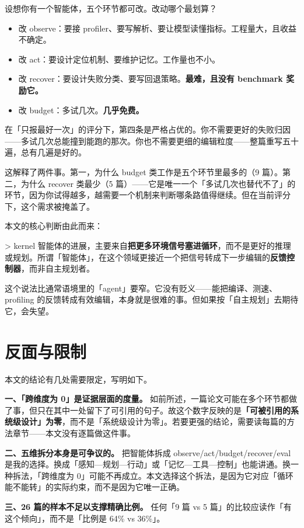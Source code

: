 设想你有一个智能体，五个环节都可改。改动哪个最划算？

\begin{itemize}
\item 改 observe：要接 profiler、要写解析、要让模型读懂指标。工程量大，且收益不确定。
\item 改 act：要设计定位机制、要维护记忆。工作量也不小。
\item 改 recover：要设计失败分类、要写回退策略。\textbf{最难，且没有 benchmark 奖励它。}
\item 改 budget：多试几次。\textbf{几乎免费。}
\end{itemize}

在「只报最好一次」的评分下，第四条是严格占优的。你不需要更好的失败归因——多试几次总能撞到能跑的那次。你也不需要更细的编辑粒度——整篇重写五十遍，总有几遍是好的。

这解释了两件事。第一，为什么 budget 类工作是五个环节里最多的（9 篇）。第二，为什么 recover 类最少（5 篇）——它是唯一一个「多试几次也替代不了」的环节，因为你试得越多，越需要一个机制来判断哪条路值得继续。但在当前评分下，这个需求被掩盖了。

本文的核心判断由此而来：

> kernel 智能体的进展，主要来自\textbf{把更多环境信号塞进循环}，而不是更好的推理或规划。所谓「智能体」，在这个领域更接近一个把信号转成下一步编辑的\textbf{反馈控制器}，而非自主规划者。

这个说法比通常语境里的「agent」要窄。它没有贬义——能把编译、测速、profiling 的反馈转成有效编辑，本身就是很难的事。但如果按「自主规划」去期待它，会失望。

\section{反面与限制}

本文的结论有几处需要限定，写明如下。

\textbf{一、「跨维度为 0」是证据层面的度量。} 如前所述，一篇论文可能在多个环节都做了事，但只在其中一处留下了可引用的句子。故这个数字反映的是\textbf{「可被引用的系统级设计」为零}，而不是「系统级设计为零」。若要更强的结论，需要读每篇的方法章节——本文没有逐篇做这件事。

\textbf{二、五维拆分本身是可争议的。} 把智能体拆成 observe/act/budget/recover/eval 是我的选择。换成「感知—规划—行动」或「记忆—工具—控制」也能讲通。换一种拆法，「跨维度为 0」可能不再成立。本文选择这个拆法，是因为它对应「循环能不能转」的实际约束，而不是因为它唯一正确。

\textbf{三、26 篇的样本不足以支撑精确比例。} 任何「9 篇 vs 5 篇」的比较应读作「有这个倾向」，而不是「比例是 64\% vs 36\%」。

